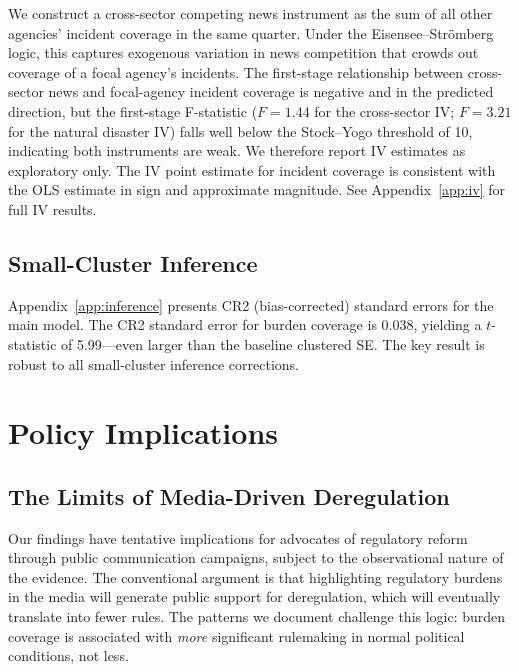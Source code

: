 \documentclass[12pt]{article}
\begin{document}
We construct a cross-sector competing news instrument as the sum of all other agencies' incident coverage in the same quarter. Under the Eisensee--Str{\"o}mberg logic, this captures exogenous variation in news competition that crowds out coverage of a focal agency's incidents. The first-stage relationship between cross-sector news and focal-agency incident coverage is negative and in the predicted direction, but the first-stage F-statistic ($F = 1.44$ for the cross-sector IV; $F = 3.21$ for the natural disaster IV) falls well below the Stock--Yogo threshold of 10, indicating both instruments are weak. We therefore report IV estimates as exploratory only. The IV point estimate for incident coverage is consistent with the OLS estimate in sign and approximate magnitude. See Appendix~\ref{app:iv} for full IV results.

\subsection{Small-Cluster Inference}

Appendix~\ref{app:inference} presents CR2 (bias-corrected) standard errors for the main model. The CR2 standard error for burden coverage is 0.038, yielding a $t$-statistic of 5.99---even larger than the baseline clustered SE. The key result is robust to all small-cluster inference corrections.

\section{Policy Implications}
\label{sec:policy}

\subsection{The Limits of Media-Driven Deregulation}

Our findings have tentative implications for advocates of regulatory reform through public communication campaigns, subject to the observational nature of the evidence. The conventional argument is that highlighting regulatory burdens in the media will generate public support for deregulation, which will eventually translate into fewer rules. The patterns we document challenge this logic: burden coverage is associated with \emph{more} significant rulemaking in normal political conditions, not less.
\end{document}
